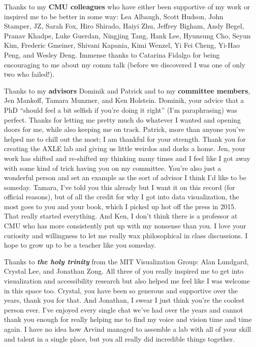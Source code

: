 \documentclass[12pt]{cmuthesis}
\begin{document}
Thanks to my \textbf{CMU colleagues} who have either been supportive of my work or inspired me to be better in some way: Lea Albaugh, Scott Hudson, John Stamper, JZ, Sarah Fox, Hiro Shirado, Haiyi Zhu, Jeffrey Bigham, Andy Begel, Pranav Khadpe, Luke Guerdan, Ningjing Tang, Hank Lee, Hyunsung Cho, Seyun Kim, Frederic Gmeiner, Shivani Kapania, Kimi Wenzel, Yi Fei Cheng, Yi-Hao Peng, and Wesley Deng. Immense thanks to Catarina Fidalgo for being encouraging to me about my comm talk (before we discovered I was one of only two who failed!).

Thanks to my \textbf{advisors} Dominik and Patrick and to my \textbf{committee members}, Jen Mankoff, Tamara Munzner, and Ken Holstein. Dominik, your advice that a PhD ``should feel a bit selfish if you're doing it right'' (I'm paraphrasing) was perfect. Thanks for letting me pretty much do whatever I wanted and opening doors for me, while also keeping me on track. Patrick, more than anyone you've helped me to chill out the most; I am thankful for your strength. Thank you for creating the AXLE lab and giving us little weirdos and dorks a home. Jen, your work has shifted and re-shifted my thinking many times and I feel like I got away with some kind of trick having you on my committee. You're also just a wonderful person and set an example as the sort of advisor I think I'd like to be someday. Tamara, I've told you this already but I want it on this record (for official reasons), but of all the credit for why I got into data visualization, the most goes to you and your book, which I picked up hot off the press in 2015. That really started everything. And Ken, I don't think there is a professor at CMU who has more consistently put up with my nonsense than you. I love your curiosity and willingness to let me really wax philosophical in class discussions. I hope to grow up to be a teacher like you someday.

Thanks to \textit{\textbf{the holy trinity}} from the MIT Visualization Group: Alan Lundgard, Crystal Lee, and Jonathan Zong. All three of you really inspired me to get into visualization and accessibility research but also helped me feel like I was welcome in this space too. Crystal, you have been so generous and supportive over the years, thank you for that. And Jonathan, I swear I just think you're the coolest person ever. I've enjoyed every single chat we've had over the years and cannot thank you enough for really helping me to find my voice and vision time and time again. I have no idea how Arvind managed to assemble a lab with all of your skill and talent in a single place, but you all really did incredible things together.
\end{document}
